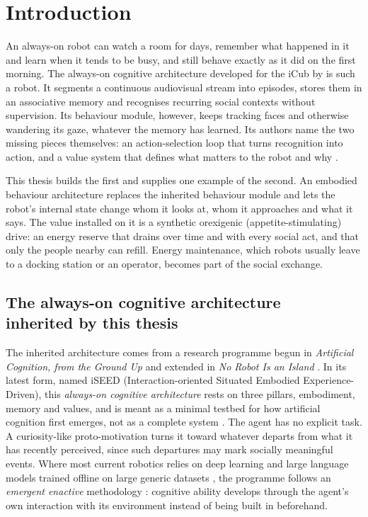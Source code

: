 \chapter{Introduction}
\label{chap:introduction}

An always-on robot can watch a room for days, remember what happened in it and learn when it tends to be busy, and still behave exactly as it did on the first morning. The always-on cognitive architecture developed for the iCub by \citet{Pasquali2024ArtificialCognition,Pasquali2025AlwaysOn} is such a robot. It segments a continuous audiovisual stream into episodes, stores them in an associative memory and recognises recurring social contexts without supervision. Its behaviour module, however, keeps tracking faces and otherwise wandering its gaze, whatever the memory has learned. Its authors name the two missing pieces themselves: an action-selection loop that turns recognition into action, and a value system that defines what matters to the robot and why \citep{Pasquali2025AlwaysOn,Pasquali2026ISEED}.

This thesis builds the first and supplies one example of the second. An embodied behaviour architecture replaces the inherited behaviour module and lets the robot's internal state change whom it looks at, whom it approaches and what it says. The value installed on it is a synthetic orexigenic (appetite-stimulating) drive: an energy reserve that drains over time and with every social act, and that only the people nearby can refill. Energy maintenance, which robots usually leave to a docking station or an operator, becomes part of the social exchange.

\section[The always-on cognitive architecture inherited by this thesis]{The always-on cognitive architecture\\inherited by this thesis}
\label{sec:intro-developmental-architecture}

The inherited architecture comes from a research programme begun in \emph{Artificial Cognition, from the Ground Up} \citep{Pasquali2024ArtificialCognition} and extended in \emph{No Robot Is an Island} \citep{Pasquali2025AlwaysOn}. In its latest form, named iSEED (Interaction-oriented Situated Embodied Experience-Driven), this \emph{always-on cognitive architecture} rests on three pillars, embodiment, memory and values, and is meant as a minimal testbed for how artificial cognition first emerges, not as a complete system \citep{Pasquali2026ISEED}. The agent has no explicit task. A curiosity-like proto-motivation turns it toward whatever departs from what it has recently perceived, since such departures may mark socially meaningful events. Where most current robotics relies on deep learning and large language models trained offline on large generic datasets \citep{Pasquali2025AlwaysOn}, the programme follows an \emph{emergent enactive} methodology \citep{Pasquali2024ArtificialCognition,Sandini2025MutualUnderstanding}: cognitive ability develops through the agent's own interaction with its environment instead of being built in beforehand.

